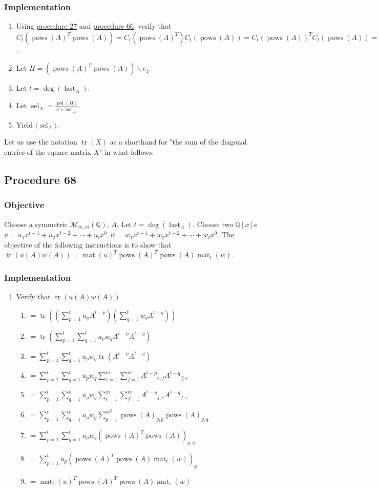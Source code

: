 \documentclass[twocolumn]{article}
\DeclareMathOperator{\mat}{mat}
\DeclareMathOperator{\pol}{pol}
\DeclareMathOperator{\tr}{tr}
\DeclareMathOperator{\pows}{pows}
\DeclareMathOperator{\sel}{sel}
\DeclareMathOperator{\last}{last}
\begin{document}
			\subsubsection{Implementation}
				\begin{enumerate}
					\item Using \hyperref[sec:procedure 27]{procedure 27} and \hyperref[sec:procedure 66]{procedure 66}, verify that $C_t(\pows(A)^T\pows(A))=C_t(\pows(A)^T)C_t(\pows(A))={C_t(\pows(A))}^TC_t(\pows(A))=\lVert C_t(\pows(A))\rVert^2>0$.
					\item Let $H=(\pows(A)^T\pows(A))\backslash e_1$.
					\item Let $t=\deg(\last_A)$.
					\item Let $\sel_A=\frac{\pol(H)}{x^t\circ\last_A}$.
					\item Yield $\langle\sel_A\rangle$.
				\end{enumerate}
		Let us use the notation $\tr(X)$ as a shorthand for "the sum of the diagonal entries of the square matrix $X$" in what follows.
		\subsection{Procedure 68}\label{sec:procedure 68}
			\subsubsection{Objective}
				Choose a symmetric $\mathcal{M}_{m,m}(\mathbb{Q})$, $A$. Let $t=\deg(\last_A)$. Choose two $\mathbb{Q}[x]$s $u=u_1x^{t-1}+u_2x^{t-2}+\cdots+u_tx^0,w=w_1x^{t-1}+w_2x^{t-2}+\cdots+w_tx^0$. The objective of the following instructions is to show that $\tr(u(A)w(A))=\mat(u)^T\pows(A)^T\pows(A)\mat_t(w)$.
			\subsubsection{Implementation}
				\begin{enumerate}
					\item Verify that $\tr(u(A)w(A))$
					\begin{enumerate}
						\item $=\tr((\sum_{p=1}^t u_pA^{t-p})(\sum_{q=1}^t w_qA^{t-q}))$
						\item $=\tr(\sum_{p=1}^t\sum_{q=1}^t u_pw_qA^{t-p}A^{t-q})$
						\item $=\sum_{p=1}^t\sum_{q=1}^t u_pw_q\tr(A^{t-p}A^{t-q})$
						\item $=\sum_{p=1}^t\sum_{q=1}^t u_pw_q\sum_{e=1}^m\sum_{f=1}^m{A^{t-p}}_{e,f}{A^{t-q}}_{f,e}$
						\item $=\sum_{p=1}^t\sum_{q=1}^t u_pw_q\sum_{e=1}^m\sum_{f=1}^m{A^{t-p}}_{f,e}{A^{t-q}}_{f,e}$
						\item $=\sum_{p=1}^t\sum_{q=1}^t u_pw_q\sum_{g=1}^{m^2}{\pows(A)}_{g,p}{\pows(A)}_{g,q}$
						\item $=\sum_{p=1}^t\sum_{q=1}^t u_pw_q(\pows(A)^T\pows(A))_{p,q}$
						\item $=\sum_{p=1}^t u_p(\pows(A)^T\pows(A)\mat_t(w))_{p}$
						\item $=\mat_t(u)^T\pows(A)^T\pows(A)\mat_t(w)$
					\end{enumerate}
				\end{enumerate}
\end{document}
